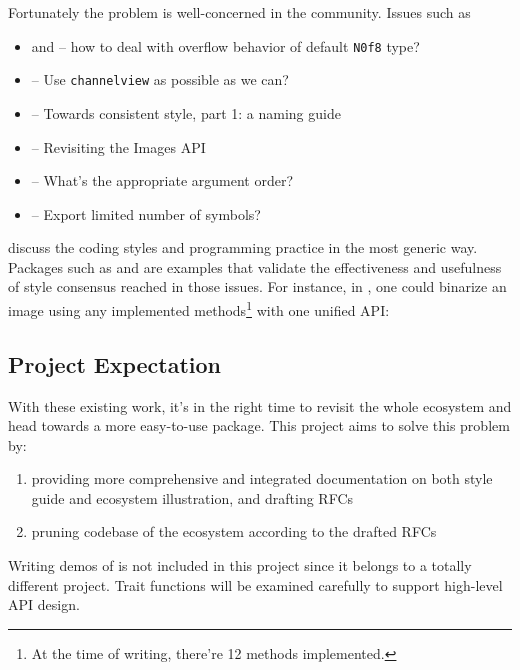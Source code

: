 Fortunately the problem is well-concerned in the community. Issues such as
\begin{itemize}
    \item {} and  -- how to deal with overflow behavior of default \texttt{N0f8} type?
    \item {} -- Use \texttt{channelview} as possible as we can?
    \item {} -- Towards consistent style, part 1: a naming guide
    \item {} -- Revisiting the Images API
    \item {} -- What's the appropriate argument order?
    \item {} -- Export limited number of symbols?
\end{itemize}
discuss the coding styles and programming practice in the most generic way. Packages such as \repohistogramthresholding and \repoimagebinarization are examples that validate the effectiveness and usefulness of style consensus reached in those issues. For instance, in \imagebinarization, one could binarize an image using any implemented methods\footnote{At the time of writing, there're 12 methods implemented.} with one unified API:

\subsection*{Project Expectation}
With these existing work, it's in the right time to revisit the whole \images{} ecosystem and head towards a more easy-to-use \images{} package. This project aims to solve this problem by:
\begin{enumerate}
    \item providing more comprehensive and integrated documentation on both style guide and ecosystem illustration, and drafting RFCs
    \item pruning codebase of the ecosystem according to the drafted RFCs
\end{enumerate}
Writing demos of \images{} is not included in this project since it belongs to a totally different project. Trait functions will be examined carefully to support high-level API design.

